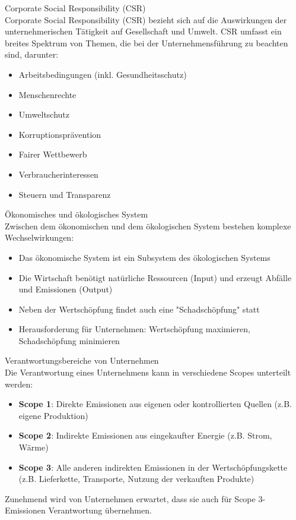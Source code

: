 \begin{definition}{Corporate Social Responsibility (CSR)}\\
Corporate Social Responsibility (CSR) bezieht sich auf die Auswirkungen der unternehmerischen Tätigkeit auf Gesellschaft und Umwelt. CSR umfasst ein breites Spektrum von Themen, die bei der Unternehmensführung zu beachten sind, darunter:
\begin{itemize}
    \item Arbeitsbedingungen (inkl. Gesundheitsschutz)
    \item Menschenrechte
    \item Umweltschutz
    \item Korruptionsprävention
    \item Fairer Wettbewerb
    \item Verbraucherinteressen
    \item Steuern und Transparenz
\end{itemize}
\end{definition}

\begin{concept}{Ökonomisches und ökologisches System}\\
Zwischen dem ökonomischen und dem ökologischen System bestehen komplexe Wechselwirkungen:
\begin{itemize}
    \item Das ökonomische System ist ein Subsystem des ökologischen Systems
    \item Die Wirtschaft benötigt natürliche Ressourcen (Input) und erzeugt Abfälle und Emissionen (Output)
    \item Neben der Wertschöpfung findet auch eine "Schadschöpfung" statt
    \item Herausforderung für Unternehmen: Wertschöpfung maximieren, Schadschöpfung minimieren
\end{itemize}
\end{concept}

\begin{concept}{Verantwortungsbereiche von Unternehmen}\\
Die Verantwortung eines Unternehmens kann in verschiedene Scopes unterteilt werden:
\begin{itemize}
    \item \textbf{Scope 1}: Direkte Emissionen aus eigenen oder kontrollierten Quellen (z.B. eigene Produktion)
    \item \textbf{Scope 2}: Indirekte Emissionen aus eingekaufter Energie (z.B. Strom, Wärme)
    \item \textbf{Scope 3}: Alle anderen indirekten Emissionen in der Wertschöpfungskette (z.B. Lieferkette, Transporte, Nutzung der verkauften Produkte)
\end{itemize}

Zunehmend wird von Unternehmen erwartet, dass sie auch für Scope 3-Emissionen Verantwortung übernehmen.
\end{concept}

